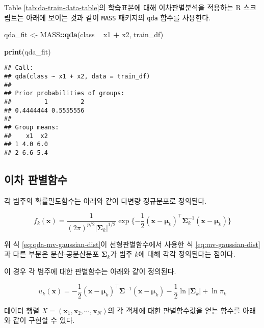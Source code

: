 \documentclass[]{book}
\newenvironment{Shaded}{\begin{snugshade}}{\end{snugshade}}
\newcommand{\KeywordTok}[1]{\textcolor[rgb]{0.13,0.29,0.53}{\textbf{#1}}}
\newcommand{\NormalTok}[1]{#1}
\newcommand{\OperatorTok}[1]{\textcolor[rgb]{0.81,0.36,0.00}{\textbf{#1}}}
\newcommand{\StringTok}[1]{\textcolor[rgb]{0.31,0.60,0.02}{#1}}
\begin{document}
Table \ref{tab:da-train-data-table}의 학습표본에 대해 이차판별분석을 적용하는 R 스크립트는 아래에 보이는 것과 같이 \texttt{MASS} 패키지의 \texttt{qda} 함수를 사용한다.

\begin{Shaded}
\begin{Highlighting}[]
\NormalTok{qda_fit <-}\StringTok{ }\NormalTok{MASS}\OperatorTok{::}\KeywordTok{qda}\NormalTok{(class }\OperatorTok{~}\StringTok{ }\NormalTok{x1 }\OperatorTok{+}\StringTok{ }\NormalTok{x2, train_df)}

\KeywordTok{print}\NormalTok{(qda_fit)}
\end{Highlighting}
\end{Shaded}

\begin{verbatim}
## Call:
## qda(class ~ x1 + x2, data = train_df)
## 
## Prior probabilities of groups:
##         1         2 
## 0.4444444 0.5555556 
## 
## Group means:
##    x1  x2
## 1 4.0 6.0
## 2 6.6 5.4
\end{verbatim}

\hypertarget{qda-function}{%
\subsection{이차 판별함수}\label{qda-function}}

각 범주의 확률밀도함수는 아래와 같이 다변량 정규분포로 정의된다.

\begin{equation}
f_k(\mathbf{x}) = \frac{1}{(2\pi)^{p/2}|\boldsymbol\Sigma_k|^{1/2}} \exp \{ -\frac{1}{2} \left(\mathbf{x} - \boldsymbol\mu_k\right)^\top \boldsymbol\Sigma_k^{-1} \left(\mathbf{x} - \boldsymbol\mu_k\right) \}
\label{eq:qda-mv-gaussian-dist}
\end{equation}

위 식 \eqref{eq:qda-mv-gaussian-dist}이 선형판별함수에서 사용한 식 \eqref{eq:mv-gaussian-dist}과 다른 부분은 분산-공분산분포 \(\boldsymbol\Sigma_k\)가 범주 \(k\)에 대해 각각 정의된다는 점이다.

이 경우 각 범주에 대한 판별함수는 아래와 같이 정의된다.

\begin{equation}
u_k(\mathbf{x}) = - \frac{1}{2} (\mathbf{x} - \boldsymbol\mu_k)^\top \boldsymbol\Sigma^{-1} (\mathbf{x} - \boldsymbol\mu_k) - \frac{1}{2} \ln \left| \boldsymbol\Sigma_k \right| + \ln \pi_k
\label{eq:qda-discriminant-function}
\end{equation}

데이터 행렬 \(X = (\mathbf{x}_1, \mathbf{x}_2, \cdots , \mathbf{x}_N)\)의 각 객체에 대한 판별함수값을 얻는 함수를 아래와 같이 구현할 수 있다.
\end{document}

